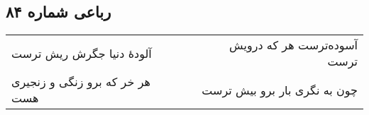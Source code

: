 \begin{center}
\section*{رباعی شماره ۸۴}
\label{sec:sh084}
\begin{longtable}{l p{0.5cm} r}
آلودهٔ دنیا جگرش ریش ترست
&&
آسوده‌ترست هر که درویش ترست
\\
هر خر که برو زنگی و زنجیری هست
&&
چون به نگری بار برو بیش ترست
\\
\end{longtable}
\end{center}

